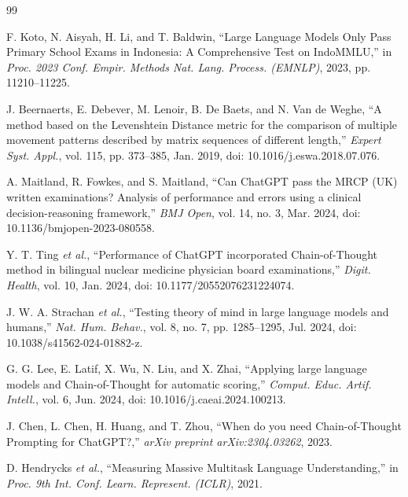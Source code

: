 \documentclass[10pt,a4paper]{article}
\begin{document}
\begingroup
\renewcommand{\section}[2]{}%
\begin{thebibliography}{99}
\fontsize{8pt}{10pt}\selectfont
\setlength{\itemsep}{1pt}
\setlength{\parskip}{0pt}

F. Koto, N. Aisyah, H. Li, and T. Baldwin, ``Large Language Models Only Pass Primary School Exams in Indonesia: A Comprehensive Test on IndoMMLU,'' in \textit{Proc. 2023 Conf. Empir. Methods Nat. Lang. Process. (EMNLP)}, 2023, pp. 11210--11225.

J. Beernaerts, E. Debever, M. Lenoir, B. De Baets, and N. Van de Weghe, ``A method based on the Levenshtein Distance metric for the comparison of multiple movement patterns described by matrix sequences of different length,'' \textit{Expert Syst. Appl.}, vol. 115, pp. 373--385, Jan. 2019, doi: 10.1016/j.eswa.2018.07.076.

A. Maitland, R. Fowkes, and S. Maitland, ``Can ChatGPT pass the MRCP (UK) written examinations? Analysis of performance and errors using a clinical decision-reasoning framework,'' \textit{BMJ Open}, vol. 14, no. 3, Mar. 2024, doi: 10.1136/bmjopen-2023-080558.

Y. T. Ting \textit{et al.}, ``Performance of ChatGPT incorporated Chain-of-Thought method in bilingual nuclear medicine physician board examinations,'' \textit{Digit. Health}, vol. 10, Jan. 2024, doi: 10.1177/20552076231224074.

J. W. A. Strachan \textit{et al.}, ``Testing theory of mind in large language models and humans,'' \textit{Nat. Hum. Behav.}, vol. 8, no. 7, pp. 1285--1295, Jul. 2024, doi: 10.1038/s41562-024-01882-z.

G. G. Lee, E. Latif, X. Wu, N. Liu, and X. Zhai, ``Applying large language models and Chain-of-Thought for automatic scoring,'' \textit{Comput. Educ. Artif. Intell.}, vol. 6, Jun. 2024, doi: 10.1016/j.caeai.2024.100213.

J. Chen, L. Chen, H. Huang, and T. Zhou, ``When do you need Chain-of-Thought Prompting for ChatGPT?,'' \textit{arXiv preprint arXiv:2304.03262}, 2023.

D. Hendrycks \textit{et al.}, ``Measuring Massive Multitask Language Understanding,'' in \textit{Proc. 9th Int. Conf. Learn. Represent. (ICLR)}, 2021.


\end{thebibliography}
\end{document}

